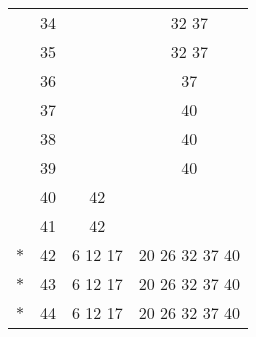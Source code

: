 \begin{tabular}[c]{r|c|c|c|}
    & 34 & & 32 37 \\ \cline{2-4}
    & 35 & & 32 37 \\ \cline{2-4}
    & 36 & & 37 \\ \cline{2-4}
    & 37 & & 40 \\ \cline{2-4}
    & 38 & & 40 \\ \cline{2-4}
    & 39 & & 40 \\ \cline{2-4}
    & 40 & 42 & \\ \cline{2-4}
    & 41 & 42 & \\ \cline{2-4}
    $*$ & 42 & 6 12 17 & 20 26 32 37 40 \\ \cline{2-4}
    $*$ & 43 & 6 12 17 & 20 26 32 37 40 \\ \cline{2-4}
    $*$ & 44 & 6 12 17 & 20 26 32 37 40 \\ \cline{2-4}
\end{tabular}
